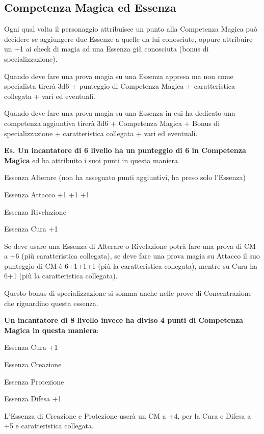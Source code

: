 \documentclass[a4paper,11pt,twoside,openany]{book}
\begin{document}
\subsection{Competenza Magica ed Essenza}

\label{competenza-magica-ed-essenza}

Ogni qual volta il personaggio attribuisce un punto alla Competenza Magica può decidere se aggiungere due Essenze a quelle da lui conosciute, oppure attribuire un +1 ai check di magia ad una Essenza già conosciuta (bonus di specializzazione).

Quando deve fare una prova magia su una Essenza appresa ma non come specialista tirerà 3d6 + punteggio di Competenza Magica + caratteristica collegata + vari ed eventuali.

Quando deve fare una prova magia su una Essenza in cui ha dedicato una competenza aggiuntiva tirerà 3d6 + Competenza Magica + Bonus di specializzazione + caratteristica collegata + vari ed eventuali.

\bigskip

\textbf{Es. Un incantatore di 6 livello ha un punteggio di 6 in Competenza Magica} ed ha attribuito i suoi punti in questa maniera

Essenza Alterare (non ha assegnato punti aggiuntivi, ha preso solo l'Essenza)

Essenza Attacco +1 +1 +1

Essenza Rivelazione

Essenza Cura +1

Se deve usare una Essenza di Alterare o Rivelazione potrà fare una prova di CM a +6 (più caratteristica collegata), se deve fare una prova magia su Attacco il suo punteggio di CM è 6+1+1+1 (più la caratteristica collegata), mentre su Cura ha 6+1 (più la caratteristica collegata).

Questo bonus di specializzazione si somma anche nelle prove di Concentrazione che riguardino questa essenza.

\bigskip

\textbf{Un incantatore di 8 livello invece ha diviso 4 punti di Competenza
	Magica in questa maniera}:

Essenza Cura +1

Essenza Creazione

Essenza Protezione

Essenza Difesa +1

L'Essenza di Creazione e Protezione userà un CM a +4, per la Cura e Difesa a +5 e caratteristica collegata.
\end{document}
